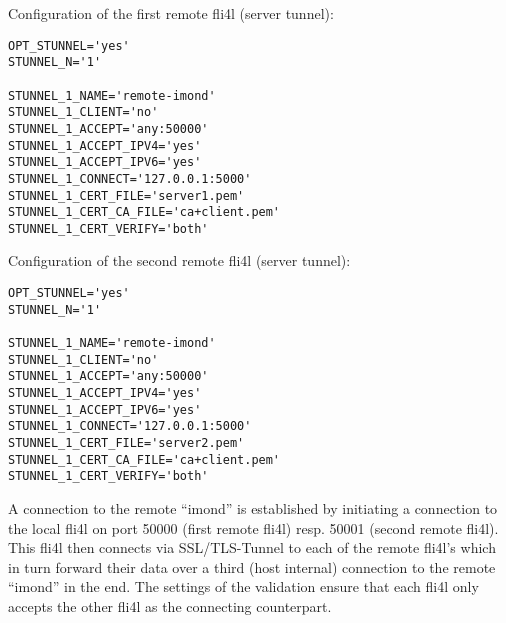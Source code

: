 Configuration of the first remote fli4l (server tunnel):
\begin{example}
\begin{verbatim}
OPT_STUNNEL='yes'
STUNNEL_N='1'

STUNNEL_1_NAME='remote-imond'
STUNNEL_1_CLIENT='no'
STUNNEL_1_ACCEPT='any:50000'
STUNNEL_1_ACCEPT_IPV4='yes'
STUNNEL_1_ACCEPT_IPV6='yes'
STUNNEL_1_CONNECT='127.0.0.1:5000'
STUNNEL_1_CERT_FILE='server1.pem'
STUNNEL_1_CERT_CA_FILE='ca+client.pem'
STUNNEL_1_CERT_VERIFY='both'
\end{verbatim}
\end{example}

Configuration of the second remote fli4l (server tunnel):
\begin{example}
\begin{verbatim}
OPT_STUNNEL='yes'
STUNNEL_N='1'

STUNNEL_1_NAME='remote-imond'
STUNNEL_1_CLIENT='no'
STUNNEL_1_ACCEPT='any:50000'
STUNNEL_1_ACCEPT_IPV4='yes'
STUNNEL_1_ACCEPT_IPV6='yes'
STUNNEL_1_CONNECT='127.0.0.1:5000'
STUNNEL_1_CERT_FILE='server2.pem'
STUNNEL_1_CERT_CA_FILE='ca+client.pem'
STUNNEL_1_CERT_VERIFY='both'
\end{verbatim}
\end{example}

A connection to the remote ``imond'' is established by initiating a connection
to the local fli4l on port 50000 (first remote fli4l) resp. 50001 (second remote
fli4l). This fli4l then connects via SSL/TLS-Tunnel to each of the remote fli4l's
which in turn forward their data over a third (host internal) connection to the
remote ``imond'' in the end. The settings of the validation ensure that each fli4l
only accepts the other fli4l as the connecting counterpart.

